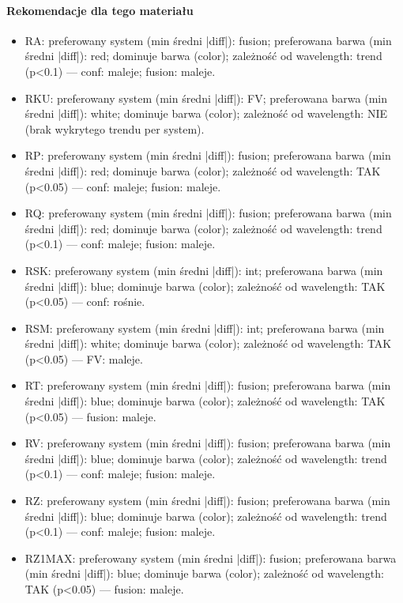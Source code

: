 \documentclass[
  10pt,
]{article}
\begin{document}
\paragraph{Rekomendacje dla tego materiału}
\begin{itemize}
\item RA: preferowany system (min średni |diff|): fusion; preferowana barwa (min średni |diff|): red; dominuje barwa (color); zależność od wavelength: trend (p<0.1) — conf: maleje; fusion: maleje.
\item RKU: preferowany system (min średni |diff|): FV; preferowana barwa (min średni |diff|): white; dominuje barwa (color); zależność od wavelength: NIE (brak wykrytego trendu per system).
\item RP: preferowany system (min średni |diff|): fusion; preferowana barwa (min średni |diff|): red; dominuje barwa (color); zależność od wavelength: TAK (p<0.05) — conf: maleje; fusion: maleje.
\item RQ: preferowany system (min średni |diff|): fusion; preferowana barwa (min średni |diff|): red; dominuje barwa (color); zależność od wavelength: trend (p<0.1) — conf: maleje; fusion: maleje.
\item RSK: preferowany system (min średni |diff|): int; preferowana barwa (min średni |diff|): blue; dominuje barwa (color); zależność od wavelength: TAK (p<0.05) — conf: rośnie.
\item RSM: preferowany system (min średni |diff|): int; preferowana barwa (min średni |diff|): white; dominuje barwa (color); zależność od wavelength: TAK (p<0.05) — FV: maleje.
\item RT: preferowany system (min średni |diff|): fusion; preferowana barwa (min średni |diff|): blue; dominuje barwa (color); zależność od wavelength: TAK (p<0.05) — fusion: maleje.
\item RV: preferowany system (min średni |diff|): fusion; preferowana barwa (min średni |diff|): blue; dominuje barwa (color); zależność od wavelength: trend (p<0.1) — conf: maleje; fusion: maleje.
\item RZ: preferowany system (min średni |diff|): fusion; preferowana barwa (min średni |diff|): blue; dominuje barwa (color); zależność od wavelength: trend (p<0.1) — conf: maleje; fusion: maleje.
\item RZ1MAX: preferowany system (min średni |diff|): fusion; preferowana barwa (min średni |diff|): blue; dominuje barwa (color); zależność od wavelength: TAK (p<0.05) — fusion: maleje.
\end{itemize}
\end{document}
